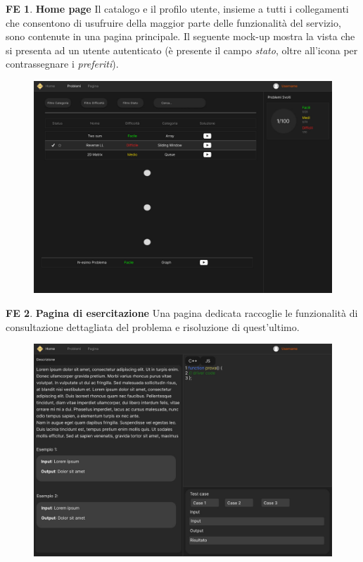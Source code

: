 \documentclass[11pt, a4paper]{article}
\theoremstyle{definition}
\newtheorem{frontend}{FE}
\begin{document}
\newpage
\begin{frontend}
\textbf{Home page }
Il catalogo e il profilo utente, insieme a tutti i collegamenti che consentono
di usufruire della maggior parte delle funzionalità del servizio, sono
contenute in una pagina principale. Il seguente mock-up mostra la vista che si
presenta ad un utente autenticato (è presente il campo \textit{stato}, oltre all'icona
per contrassegnare i \textit{preferiti}).
\end{frontend}
\begin{figure}[H]
\centering
\includegraphics[scale=0.195]{materiale/immaginife/homecatalogo.jpeg}
\end{figure}

\begin{frontend}
\textbf{Pagina di esercitazione }
Una pagina dedicata raccoglie le funzionalità di consultazione dettagliata
del problema e risoluzione di quest'ultimo.
\end{frontend}
\begin{figure}[H]
\centering
\includegraphics[scale=0.195]{materiale/immaginife/esercitazione.jpeg}
\end{figure}
\end{document}
